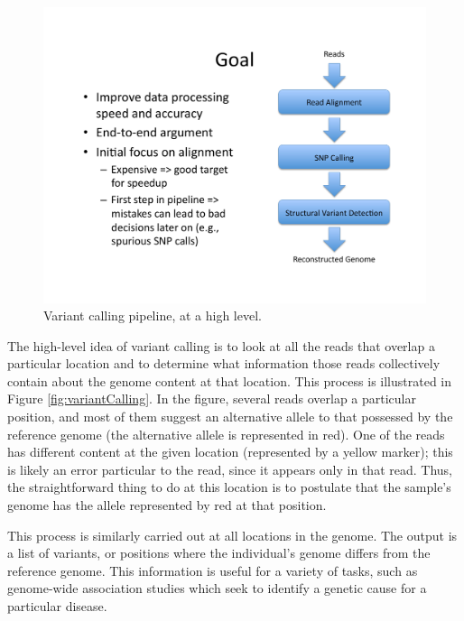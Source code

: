 \documentclass[twocolumn,10pt]{article}
\begin{document}
\begin{figure}
\centering
\includegraphics[scale=0.6]{pipeline.pdf}
\caption{Variant calling pipeline, at a high level.}
\label{fig:pipeline}
\end{figure}

The high-level idea of variant calling is to look at all the reads that overlap a particular location and to determine what information those reads collectively contain about the genome content at that location.  This process is illustrated in Figure \ref{fig:variantCalling}.  In the figure, several reads overlap a particular position, and most of them suggest an alternative allele to that possessed by the reference genome (the alternative allele is represented in red).  One of the reads has different content at the given location (represented by a yellow marker); this is likely an error particular to the read, since it appears only in that read.  Thus, the straightforward thing to do at this location is to postulate that the sample's genome has the allele represented by red at that position.

This process is similarly carried out at all locations in the genome.  The output is a list of variants, or positions where the individual's genome differs from the reference genome.  This information is useful for a variety of tasks, such as genome-wide association studies which seek to identify a genetic cause for a particular disease.  
\end{document}
